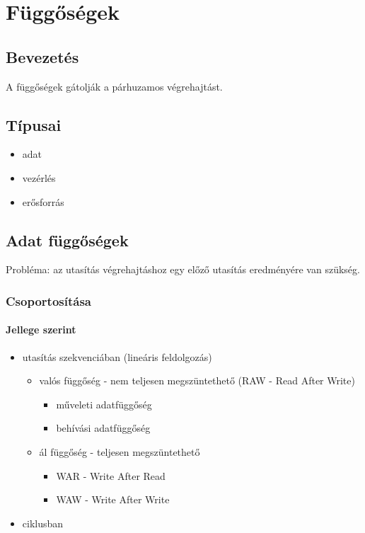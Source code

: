 
\chapter{Függőségek}

\section{Bevezetés}
A függőségek gátolják a párhuzamos végrehajtást.

\section{Típusai}
\begin{itemize}
    \item adat
    \item vezérlés
    \item erősforrás
\end{itemize}

\section{Adat függőségek}
Probléma: az utasítás végrehajtáshoz egy előző utasítás eredményére van szükség.

\subsection{Csoportosítása}
\subsubsection{Jellege szerint}
\begin{itemize}
    \item utasítás szekvenciában (lineáris feldolgozás)
          \begin{itemize}
              \item valós függőség - nem teljesen megszüntethető (RAW - Read After Write)
                    \begin{itemize}
                        \item műveleti adatfüggőség
                        \item behívási adatfüggőség
                    \end{itemize}
              \item ál függőség - teljesen megszüntethető
                    \begin{itemize}
                        \item WAR - Write After Read
                        \item WAW - Write After Write
                    \end{itemize}
          \end{itemize}
    \item ciklusban
\end{itemize}

